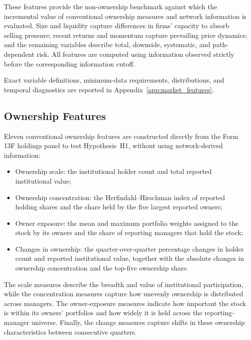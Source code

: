 \noindent
These features provide the non-ownership benchmark against which the incremental value of conventional ownership measures and network information is evaluated. Size and liquidity capture differences in firms' capacity to absorb selling pressure; recent returns and momentum capture prevailing price dynamics; and the remaining variables describe total, downside, systematic, and path-dependent risk. All features are computed using information observed strictly before the corresponding information cutoff.

Exact variable definitions, minimum-data requirements, distributions, and temporal diagnostics are reported in Appendix~\ref{app:market_features}.

\subsection{Ownership Features}
\label{sec:crowding_measures}

Eleven conventional ownership features are constructed directly from the Form 13F holdings panel to test Hypothesis~H1, without using network-derived information:

\begin{itemize}
    \item Ownership scale: the institutional holder count and total reported institutional value;
    \item Ownership concentration: the Herfindahl--Hirschman index of reported holding shares and the share held by the five largest reported owners;
    \item Owner exposure: the mean and maximum portfolio weights assigned to the stock by its owners and the share of reporting managers that hold the stock;
    \item Changes in ownership: the quarter-over-quarter percentage changes in holder count and reported institutional value, together with the absolute changes in ownership concentration and the top-five ownership share.
\end{itemize}

\noindent
The scale measures describe the breadth and value of institutional participation, while the concentration measures capture how unevenly ownership is distributed across managers. The owner-exposure measures indicate how important the stock is within its owners' portfolios and how widely it is held across the reporting-manager universe. Finally, the change measures capture shifts in these ownership characteristics between consecutive quarters.

